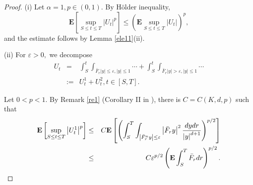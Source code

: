 \documentclass[11pt]{amsart}
\theoremstyle{plain}
\numberwithin{equation}{section}
\begin{document}
\begin{proof}
(i) Let $\alpha =1,p\in \left( 0,1\right) $. By H\"{o}lder inequality,\begin{equation*}
\mathbf{E}\left[ \sup_{S\leq t\leq T}\left\vert U_{t}\right\vert ^{p}\right]
\leq \left( \mathbf{E}\sup_{S\leq t\leq T}\left\vert U_{t}\right\vert
\right) ^{p},
\end{equation*}and the estimate follows by Lemma \ref{ele11}(ii).

(ii) For $\varepsilon >0,$ we decompose\begin{eqnarray*}
U_{t} &=&\int_{S}^{t}\int_{\bar{F}_{r}\left\vert y\right\vert \leq
\varepsilon ,\left\vert y\right\vert \leq 1}\cdots+\int_{S}^{t}\int_{\bar{F}_{r}\left\vert y\right\vert >\varepsilon ,\left\vert y\right\vert \leq
1}\cdots \\
&:=&U_{t}^{1}+U_{t}^{2},t\in \left[ S,T\right] .
\end{eqnarray*}

Let $0<p<1$. By Remark \ref{re1} (Corollary II in \cite{le}), there is $C=C\left( K,d,p\right) $ such that 
\begin{eqnarray}
\mathbf{E}\left[ \sup_{S\leq t\leq T}\left\vert U_{t}^{1}\right\vert ^{p}\right] &\leq &C\mathbf{E}\left[ \left( \int_{S}^{T}\int_{\left\vert \bar{F}_{r}^{n}y\right\vert \leq \varepsilon }\left\vert \bar{F}_{r}y\right\vert
^{2}\frac{dydr}{\left\vert y\right\vert ^{d+1}}\right) ^{p/2}\right]
\label{fo01} \\
&\leq &C\varepsilon ^{p/2}\left( \mathbf{E}\int_{S}^{T}\bar{F}_{r}dr\right)
^{p/2}.  \notag
\end{eqnarray}


\end{proof}
\end{document}
